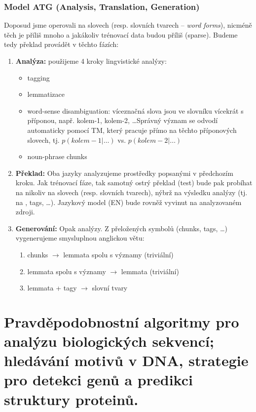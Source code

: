 \documentclass[11pt]{report} %
\numberwithin{equation}{section}
\begin{document}
\subsubsection{Model ATG (Analysis, Translation, Generation)}
Doposud jsme operovali na slovech (resp. slovních tvarech -- \textit{word forms}), nicméně těch je příliš mnoho a jakákoliv trénovací data budou příliš  (sparse). Budeme tedy překlad provádět v těchto fázích:
\begin{enumerate}
	\item \textbf{Analýza:} použijeme 4 kroky lingvistické analýzy:
	\begin{itemize}
		\item tagging
		\item lemmatizace
		\item word-sense disambiguation: víceznačná slova jsou ve slovníku vícekrát s příponou, např. kolem-1, kolem-2, \dots Správný význam se odvodí automaticky pomocí TM, který pracuje přímo na těchto příponových slovech, tj. $p(kolem-1|\dots)$ vs. $p(kolem-2|\dots)$
		\item noun-phrase chunks
	\end{itemize}

	\item \textbf{Překlad:} Oba jazyky analyzujeme prostředky popsanými v předchozím kroku. Jak trénovací fáze, tak samotný ostrý překlad (test) bude pak probíhat na nikoliv na slovech (resp. slovních tvarech), nýbrž na výsledku analýzy (tj. na , tags, \dots). Jazykový model (EN) bude rovněž vyvinut na analyzovaném zdroji.
	
	\item \textbf{Generování:} Opak analýzy. Z přeložených symbolů (chunks, tags, \dots) vygenerujeme smysluplnou anglickou větu:
	\begin{enumerate}
		
		
		\item chunks $\rightarrow$ lemmata spolu s významy (triviální)
		\item lemmata spolu s významy $\rightarrow$ lemmata (triviální) 
		\item lemmata + tagy $\rightarrow$ slovní tvary 
	\end{enumerate}
\end{enumerate}








\section{Pravděpodobnostní algoritmy pro analýzu biologických sekvencí; hledávání motivů v DNA, strategie pro detekci genů a predikci struktury proteinů.}
\end{document}
